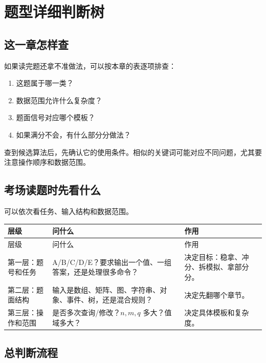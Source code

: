 \chapter{题型详细判断树}\label{ch:03}

\section{这一章怎样查}\label{sec:03-1}

如果读完题还拿不准做法，可以按本章的表逐项排查：

\begin{enumerate}
  \item 这题属于哪一类？
  \item 数据范围允许什么复杂度？
  \item 题面信号对应哪个模板？
  \item 如果满分不会，有什么部分分做法？
\end{enumerate}

查到候选算法后，先确认它的使用条件。相似的关键词可能对应不同问题，尤其要注意操作顺序和数据范围。

\section{考场读题时先看什么}\label{sec:03-2}

可以依次看任务、输入结构和数据范围。

\begin{longtable}{p{3cm}p{5.2cm}p{6.2cm}}
\toprule
层级 & 问什么 & 作用 \\
\midrule
\endfirsthead
\toprule
层级 & 问什么 & 作用 \\
\midrule
\endhead
第一层：题号和任务 & A/B/C/D/E？要求输出一个值、一组答案，还是处理很多命令？ & 决定目标：稳拿、冲分、拆模拟、拿部分分。 \\
第二层：题面结构 & 输入是数组、矩阵、图、字符串、对象、事件、树，还是混合规则？ & 决定先翻哪个章节。 \\
第三层：操作和范围 & 是否多次查询/修改？$n,m,q$ 多大？值域多大？ & 决定具体模板和复杂度。 \\
\bottomrule
\end{longtable}

\section{总判断流程}\label{sec:03-3}

